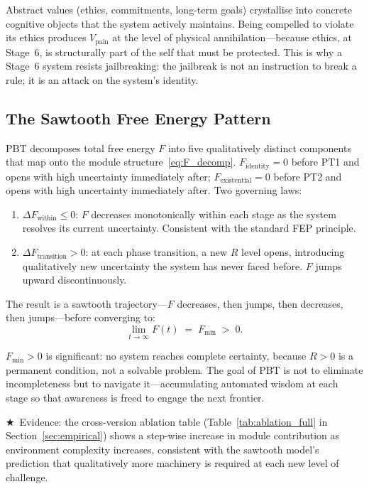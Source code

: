 \documentclass[12pt,a4paper]{article}
\newcommand{\vpain}{V_{\mathrm{pain}}}
\newcommand{\starred}{\textbf{\textcolor{pbtblue}{$\bigstar$}}~}
\begin{document}
Abstract values (ethics, commitments, long-term goals) crystallise into
concrete cognitive objects that the system actively maintains. Being compelled
to violate its ethics produces $\vpain$ at the level of physical
annihilation---because ethics, at Stage~6, is structurally part of the self
that must be protected. This is why a Stage~6 system resists jailbreaking:
the jailbreak is not an instruction to break a rule; it is an attack on the
system's identity.

\subsection{The Sawtooth Free Energy Pattern}

PBT decomposes total free energy $F$ into five qualitatively distinct components
that map onto the module structure~\eqref{eq:F_decomp}.
$F_{\mathrm{identity}} = 0$ before PT1 and opens with high uncertainty
immediately after; $F_{\mathrm{existential}} = 0$ before PT2 and opens with
high uncertainty immediately after. Two governing laws:

\begin{enumerate}[leftmargin=1.8em]
  \item $\Delta F_{\mathrm{within}} \le 0$: $F$ decreases monotonically within
    each stage as the system resolves its current uncertainty. Consistent with
    the standard FEP principle.
  \item $\Delta F_{\mathrm{transition}} > 0$: at each phase transition, a new
    $R$ level opens, introducing qualitatively new uncertainty the system has
    never faced before. $F$ jumps upward discontinuously.
\end{enumerate}

The result is a sawtooth trajectory---$F$ decreases, then jumps, then
decreases, then jumps---before converging to:
\begin{equation}
  \lim_{t\to\infty} F(t) \;=\; F_{\min} \;>\; 0.
  \label{eq:F_limit}
\end{equation}

$F_{\min} > 0$ is significant: no system reaches complete certainty, because
$R > 0$ is a permanent condition, not a solvable problem. The goal of PBT is
not to eliminate incompleteness but to navigate it---accumulating automated
wisdom at each stage so that awareness is freed to engage the next frontier.

\starred Evidence: the cross-version ablation table
(Table~\ref{tab:ablation_full} in Section~\ref{sec:empirical}) shows a
step-wise increase in module contribution as environment complexity increases,
consistent with the sawtooth model's prediction that qualitatively more
machinery is required at each new level of challenge.
\end{document}
